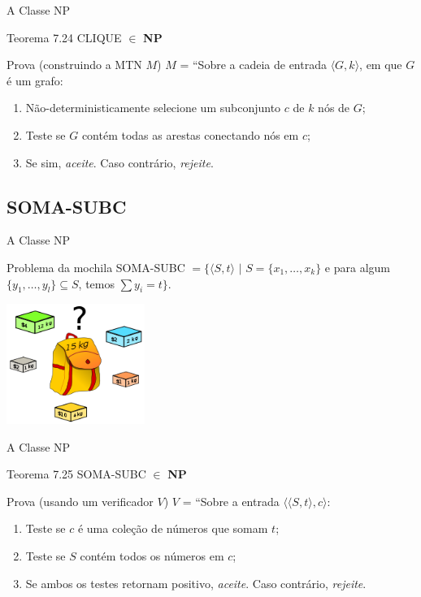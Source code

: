 \documentclass[xcolor=dvipsnames,table]{beamer}
\begin{document}
	\begin{frame}{A Classe NP}
		\begin{block}{Teorema 7.24}
			CLIQUE $\in$ {\bf NP}
		\end{block} \pause
		\begin{block}{Prova (construindo a MTN $M$)}
			$M$ = ``Sobre a cadeia de entrada $\langle G, k \rangle$, em que $G$ é um grafo:
			\begin{enumerate}
				\item Não-deterministicamente selecione um subconjunto $c$ de $k$ nós de $G$;
				\item Teste se $G$ contém todas as arestas conectando nós em $c$;
				\item Se sim, {\it aceite}. Caso contrário, {\it rejeite}.
			\end{enumerate}
		\end{block}
	\end{frame}
	
	\subsection{SOMA-SUBC}
	\begin{frame}{A Classe NP}
		\begin{block}{Problema da mochila}
			SOMA-SUBC $= \{ \langle S, t \rangle \mbox{ | } S = \{ x_1, \ldots, x_k\}$ e para algum $\{y_1, \ldots, y_l\} \subseteq S$, temos $\sum y_i = t\}$.
		\end{block}  \pause
		\begin{center}
			\includegraphics[width=4.5cm]{images/mochila.png}
		\end{center}
	\end{frame}	
	
	\begin{frame}{A Classe NP}
		\begin{block}{Teorema 7.25}
			SOMA-SUBC $\in$ {\bf NP}
		\end{block} \pause
		\begin{block}{Prova (usando um verificador $V$)}
			$V$ = ``Sobre a entrada $\langle \langle S, t \rangle, c \rangle$:
			\begin{enumerate}
				\item Teste se $c$ é uma coleção de números que somam $t$;
				\item Teste se $S$ contém todos os números em $c$;
				\item Se ambos os testes retornam positivo, {\it aceite}. Caso contrário, {\it rejeite}.
			\end{enumerate}
		\end{block}
	\end{frame}
	
\end{document}
